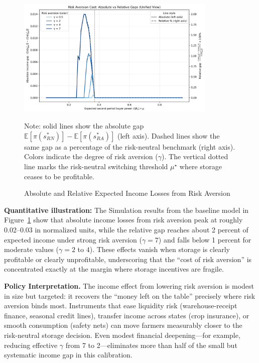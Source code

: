 \begin{figure}[ht!]
    \centering
    \includegraphics[width=0.85\textwidth]{model_figures/income_gap_vs_mu_(unified).png}
    \caption{Absolute and Relative Expected Income Losses from Risk Aversion}
    \label{fig:unified_gap_plot}
    \begin{tablenotes}
    \footnotesize
    \item Note: solid lines show the absolute gap $\mathbb{E}[\pi(s^*_{RN})]-\mathbb{E}[\pi(s^*_{RA})]$ (left axis). 
    Dashed lines show the same gap as a percentage of the risk-neutral benchmark (right axis). 
    Colors indicate the degree of risk aversion ($\gamma$). 
    The vertical dotted line marks the risk-neutral switching threshold $\mu^\star$ where storage ceases to be profitable.
    \end{tablenotes}
\end{figure}


\textbf{Quantitative illustration:} The Simulation results from the baseline model in Figure~\ref{fig:unified_gap_plot} show that absolute income losses from risk aversion peak at roughly 0.02--0.03 in normalized units, while the relative gap reaches about 2 percent of expected income under strong risk aversion ($\gamma=7$) and falls below 1 percent for moderate values ($\gamma=2$ to $4$). These effects vanish when storage is clearly profitable or clearly unprofitable, underscoring that the ``cost of risk aversion'' is concentrated exactly at the margin where storage incentives are fragile.

\textbf{Policy Interpretation.} The income effect from lowering risk aversion is modest in size but targeted: it recovers the ``money left on the table'' precisely where risk aversion binds most. Instruments that ease liquidity risk (warehouse-receipt finance, seasonal credit lines), transfer income across states (crop insurance), or smooth consumption (safety nets) can move farmers measurably closer to the risk-neutral storage decision. Even modest financial deepening---for example, reducing effective $\gamma$ from 7 to 2---eliminates more than half of the small but systematic income gap in this calibration.















